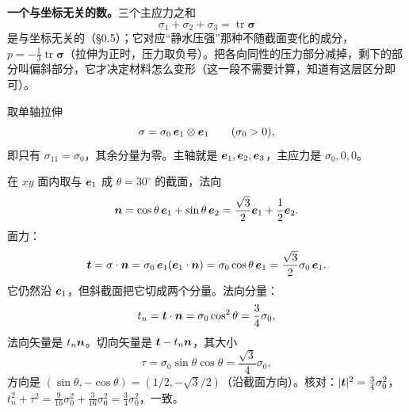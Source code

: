 \documentclass[11pt]{ctexart}
\newcommand{\ten}[1]{\mathbf{#1}}
\newcommand{\tr}{\operatorname{tr}}
\let\origsubhdr\subhdr
\renewcommand{\subhdr}[1]{\par\needspace{3\baselineskip}\origsubhdr{#1}}
\begin{document}
\textbf{一个与坐标无关的数。}三个主应力之和
\[
\sigma_1+\sigma_2+\sigma_3=\tr\ten\sigma
\]
是与坐标无关的（§0.5）；它对应“静水压强”那种不随截面变化的成分，$p=-\tfrac13\tr\ten\sigma$（拉伸为正时，压力取负号）。把各向同性的压力部分减掉，剩下的部分叫偏斜部分，它才决定材料怎么变形（这一段不需要计算，知道有这层区分即可）。


取单轴拉伸
\[
\ten\sigma=\sigma_0\,\vect e_1\otimes\vect e_1
\qquad(\sigma_0>0),
\]
即只有 $\sigma_{11}=\sigma_0$，其余分量为零。主轴就是 $\boldsymbol{e}_1,\boldsymbol{e}_2,\boldsymbol{e}_3$，主应力是 $\sigma_0,0,0$。

在 $xy$ 面内取与 $\boldsymbol{e}_1$ 成 $\theta=30^\circ$ 的截面，法向
\[
\boldsymbol{n}=\cos\theta\,\boldsymbol{e}_1+\sin\theta\,\boldsymbol{e}_2=\frac{\sqrt3}{2}\boldsymbol{e}_1+\frac12\boldsymbol{e}_2 .
\]
面力：
\[
\vect t=\ten\sigma\cdot\vect n
=\sigma_0\,\vect e_1(\vect e_1\cdot\vect n)
=\sigma_0\cos\theta\,\vect e_1
=\frac{\sqrt3}{2}\sigma_0\,\vect e_1 .
\]
它仍然沿 $\boldsymbol{e}_1$，但斜截面把它切成两个分量。法向分量：
\[
t_n=\boldsymbol{t}\cdot\boldsymbol{n}=\sigma_0\cos^2\theta=\frac34\sigma_0,
\]
法向矢量是 $t_n\boldsymbol{n}$。切向矢量是 $\boldsymbol{t}-t_n\boldsymbol{n}$，其大小
\[
\tau=\sigma_0\sin\theta\cos\theta=\frac{\sqrt3}{4}\sigma_0,
\]
方向是 $(\sin\theta,-\cos\theta)=(1/2,-\sqrt3/2)$（沿截面方向）。核对：$|\boldsymbol{t}|^2=\tfrac34\sigma_0^2$，$t_n^2+\tau^2=\tfrac{9}{16}\sigma_0^2+\tfrac{3}{16}\sigma_0^2=\tfrac34\sigma_0^2$，一致。
\end{document}

